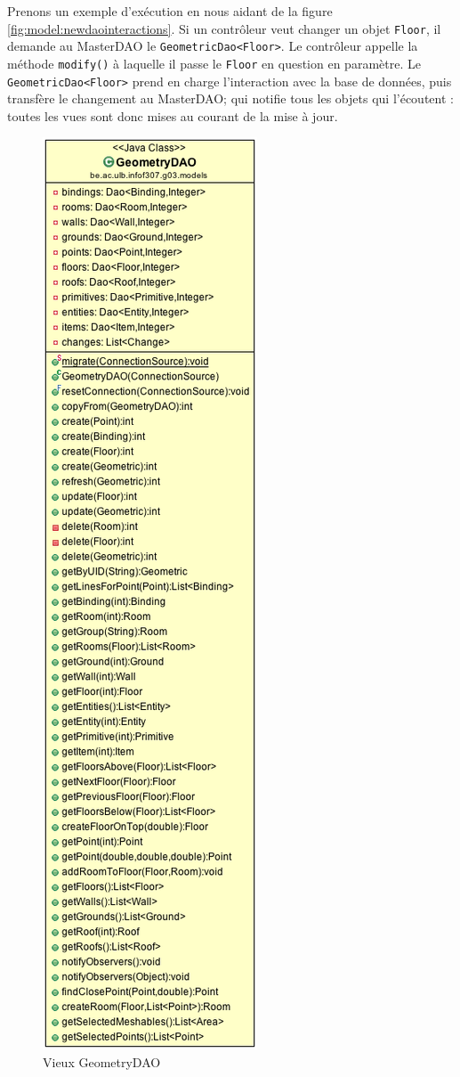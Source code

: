 		Prenons un exemple d'exécution en nous aidant de la figure \ref{fig:model:newdaointeractions}. Si un contrôleur veut changer un objet \texttt{Floor}, il demande au
		MasterDAO le \texttt{GeometricDao<Floor>}. Le contrôleur appelle la méthode
		\texttt{modify()} à laquelle il passe le \texttt{Floor} en question en paramètre.
		Le \texttt{GeometricDao<Floor>} prend en charge l'interaction avec la base
		de données, puis transfère le changement au MasterDAO; qui notifie tous
		les objets qui l'écoutent : toutes les vues sont donc mises au courant
		de la mise à jour.
		\begin{figure}
			\center
			\includegraphics[height=0.9\textheight]{iteration3/fig/OldGeometryDAO.png}
			\caption{\label{fig:model:olddaoclass} Vieux GeometryDAO}
		\end{figure}

